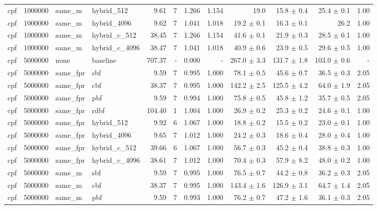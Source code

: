 \begin{tabular}{llllrrrrrrrr}
cpf & 1000000 & same\_m & hybrid\_512 & 9.61 & 7 & 1.266 & 1.154 & 19.0 & 15.8 $\pm$ 0.4 & 25.4 $\pm$ 0.1 & 1.00 \\
cpf & 1000000 & same\_m & hybrid\_4096 & 9.62 & 7 & 1.041 & 1.018 & 19.2 $\pm$ 0.1 & 16.3 $\pm$ 0.1 & 26.2 & 1.00 \\
cpf & 1000000 & same\_m & hybrid\_c\_512 & 38.45 & 7 & 1.266 & 1.154 & 41.6 $\pm$ 0.1 & 21.9 $\pm$ 0.3 & 28.5 $\pm$ 0.1 & 1.00 \\
cpf & 1000000 & same\_m & hybrid\_c\_4096 & 38.47 & 7 & 1.041 & 1.018 & 40.9 $\pm$ 0.6 & 23.9 $\pm$ 0.5 & 29.6 $\pm$ 0.5 & 1.00 \\
cpf & 5000000 & none & baseline & 707.37 & - & 0.000 & - & 267.0 $\pm$ 3.3 & 131.7 $\pm$ 1.8 & 103.0 $\pm$ 0.6 & - \\
cpf & 5000000 & same\_fpr & sbf & 9.59 & 7 & 0.995 & 1.000 & 78.1 $\pm$ 0.5 & 45.6 $\pm$ 0.7 & 36.5 $\pm$ 0.3 & 2.05 \\
cpf & 5000000 & same\_fpr & cbf & 38.37 & 7 & 0.995 & 1.000 & 142.2 $\pm$ 2.5 & 125.5 $\pm$ 4.2 & 64.0 $\pm$ 1.9 & 2.05 \\
cpf & 5000000 & same\_fpr & pbf & 9.59 & 7 & 0.994 & 1.000 & 75.8 $\pm$ 0.5 & 45.8 $\pm$ 1.2 & 35.7 $\pm$ 0.5 & 2.05 \\
cpf & 5000000 & same\_fpr & rdbf & 104.40 & 1 & 1.004 & 1.000 & 26.9 $\pm$ 0.2 & 25.3 $\pm$ 0.2 & 24.6 $\pm$ 0.1 & 1.00 \\
cpf & 5000000 & same\_fpr & hybrid\_512 & 9.92 & 6 & 1.067 & 1.000 & 18.8 $\pm$ 0.2 & 15.5 $\pm$ 0.2 & 23.0 $\pm$ 0.1 & 1.00 \\
cpf & 5000000 & same\_fpr & hybrid\_4096 & 9.65 & 7 & 1.012 & 1.000 & 24.2 $\pm$ 0.3 & 18.6 $\pm$ 0.4 & 28.0 $\pm$ 0.4 & 1.00 \\
cpf & 5000000 & same\_fpr & hybrid\_c\_512 & 39.66 & 6 & 1.067 & 1.000 & 56.7 $\pm$ 0.3 & 45.2 $\pm$ 0.4 & 38.8 $\pm$ 0.3 & 1.00 \\
cpf & 5000000 & same\_fpr & hybrid\_c\_4096 & 38.61 & 7 & 1.012 & 1.000 & 70.4 $\pm$ 0.3 & 57.9 $\pm$ 8.2 & 48.0 $\pm$ 0.2 & 1.00 \\
cpf & 5000000 & same\_m & sbf & 9.59 & 7 & 0.995 & 1.000 & 76.5 $\pm$ 0.7 & 44.2 $\pm$ 0.8 & 36.2 $\pm$ 0.3 & 2.05 \\
cpf & 5000000 & same\_m & cbf & 38.37 & 7 & 0.995 & 1.000 & 143.4 $\pm$ 1.6 & 126.9 $\pm$ 3.1 & 64.7 $\pm$ 1.4 & 2.05 \\
cpf & 5000000 & same\_m & pbf & 9.59 & 7 & 0.993 & 1.000 & 76.2 $\pm$ 0.7 & 47.2 $\pm$ 1.6 & 36.1 $\pm$ 0.3 & 2.05 \\

\end{tabular}

